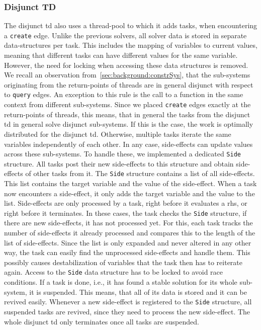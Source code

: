    \subsubsection{Disjunct TD}
    \label{sec:method:td_parallel:disjunct}
    The disjunct \ac{td} also uses a thread-pool to which it adds tasks, when encountering a \texttt{create} edge. Unlike the previous solvers, all solver data is stored in separate data-structures per task. This includes the mapping of variables to current values, meaning that different tasks can have different values for the same variable. However, the need for locking when accessing these data structures is removed. We recall an observation from~\autoref{sec:background:constrSys}, that the sub-systems originating from the return-points of threads are in general disjunct with respect to \texttt{query} edges. An exception to this rule is the call to a function in the same context from different sub-systems. Since we placed \texttt{create} edges exactly at the return-points of threads, this means, that in general the tasks from the disjunct \ac{td} in general solve disjunct sub-systems. If this is the case, the work is optimally distributed for the disjunct \ac{td}. Otherwise, multiple tasks iterate the same variables independently of each other.
    In any case, side-effects can update values across these sub-systems. To handle these, we implemented a dedicated \texttt{Side} structure. All tasks post their new side-effects to this structure and obtain side-effects of other tasks from it. The \texttt{Side} structure contains a list of all side-effects. This list contains the target variable and the value of the side-effect. When a task now encounters a side-effect, it only adds the target variable and the value to the list. Side-effects are only processed by a task, right before it evaluates a \ac{rhs}, or right before it terminates. In these cases, the task checks the \texttt{Side} structure, if there are new side-effects, it has not processed yet. For this, each task tracks the number of side-effects it already processed and compares this to the length of the list of side-effects. Since the list is only expanded and never altered in any other way, the task can easily find the unprocessed side-effects and handle them. This possibly causes destabilization of variables that the task then has to reiterate again. Access to the \texttt{Side} data structure has to be locked to avoid race conditions.
    If a task is done, i.e., it has found a stable solution for its whole sub-system, it is suspended. This means, that all of its data is stored and it can be revived easily. Whenever a new side-effect is registered to the \texttt{Side} structure, all suspended tasks are revived, since they need to process the new side-effect. The whole disjunct \ac{td} only terminates once all tasks are suspended.
